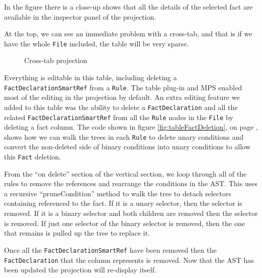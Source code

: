 In the figure there is a close-up shows that all the details of the selected fact are available in the inspector panel of the projection.

At the top, we can see an immediate problem with a cross-tab, and that is if we have the whole \texttt{File} included, the table will be very sparse.

\begin{figure}
    \centering
    \caption{Cross-tab projection}
    \label{fig:crosstabProjection1}
\end{figure}

Everything is editable in this table, including deleting a \texttt{FactDeclarationSmartRef} from a \texttt{Rule}.
The table plug-in and MPS enabled most of the editing in the projection by default.
An extra editing feature we added to this table was the ability to delete a \texttt{FactDeclaration} and all the related \texttt{FactDeclarationSmartRef} from all the \texttt{Rule} nodes in the \texttt{File} by deleting a fact column.
The code shown in figure \ref{fig:tableFactDeletion}, on page \pageref{fig:tableFactDeletion}, shows how we can walk the trees in each \texttt{Rule} to delete unary conditions and convert the non-deleted side of binary conditions into unary conditions to allow this \texttt{Fact} deletion.

From the ``on delete'' section of the vertical section, we loop through all of the rules to remove the references and rearrange the conditions in the AST.
This uses a recursive ``pruneCondition'' method to walk the tree to detach selectors containing referenced to the fact.
If it is a unary selector, then the selector is removed.
If it is a binary selector and both children are removed then the selector is removed.
If just one selector of the binary selector is removed, then the one that remains is pulled up the tree to replace it.

Once all the \texttt{FactDeclarationSmartRef} have been removed then the \texttt{FactDeclaration} that the column represents is removed.
Now that the AST has been updated the projection will re-display itself.

